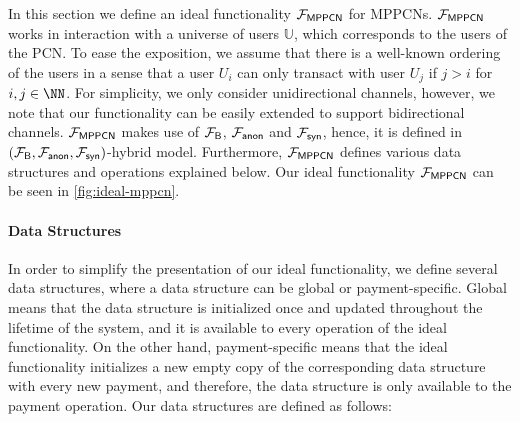 In this section we define an ideal functionality $\mathcal{F}_{\mathsf{MPPCN}}$ for MPPCNs. 
$\mathcal{F}_{\mathsf{MPPCN}}$ works in interaction with a universe of users $\mathbb{U}$, which 
corresponds to the users of the PCN. To ease the exposition, we assume that there is a 
well-known ordering of the users in a sense that a user $U_i$ can only transact with user $U_j$ 
if $j > i$ for $i,j \in \NN$. For simplicity, we only consider unidirectional channels, 
however, we note that our functionality can be easily extended to support bidirectional 
channels.  $\mathcal{F}_{\mathsf{MPPCN}}$ makes use of $\mathcal{F}_{\mathsf{B}}$, $\mathcal{F}_{\mathsf{anon}}$ and $\mathcal{F}_{\mathsf{syn}}$, 
hence, it is defined in $(\mathcal{F}_{\mathsf{B}}, \mathcal{F}_{\mathsf{anon}}, \mathcal{F}_{\mathsf{syn}})$-hybrid model. Furthermore, 
$\mathcal{F}_{\mathsf{MPPCN}}$ defines various data structures and operations explained below. 
Our ideal functionality $\mathcal{F}_{\mathsf{MPPCN}}$ can be seen in \cref{fig:ideal-mppcn}.

\paragraph{Data Structures} 
In order to simplify the presentation of our ideal functionality, we define several data 
structures, where a data structure can be global or payment-specific. Global means that the 
data structure is initialized once and updated throughout the lifetime of the system, and it 
is available to every operation of the ideal functionality. On the other hand, payment-specific 
means that the ideal functionality initializes a new empty copy of the corresponding data 
structure with every new payment, and therefore, the data structure is only available to 
the payment operation. Our data structures are defined as follows:

